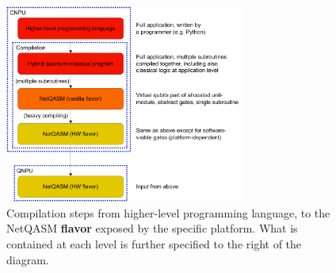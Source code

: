 \begin{figure}
      \centering
      \includegraphics[width=0.7\textwidth]{figures/netqasm/comp-chain.pdf}
      \caption{Compilation steps from higher-level programming language, to the
            \ac{NetQASM} \textbf{flavor} exposed by the specific platform. What is
            contained at each level is further specified to the right of the
            diagram.}
      \label{netqasm:fig:comp_chain}
\end{figure}
